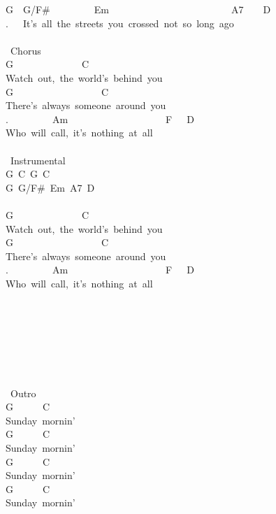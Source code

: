 {G\ \ G/F\#\ \ \ \ \ \ \ \ \ Em\ \ \ \ \ \ \ \ \ \ \ \ \ \ \ \ \ \ \ \ \ \ \ \ \ A7\ \ \ \ D\\
.\ \ \ It's\ all\ the\ streets\ you\ crossed\ not\ so\ long\ ago\\
\\
\lbrack\ Chorus\rbrack\\
G\ \ \ \ \ \ \ \ \ \ \ \ \ \ C\\
Watch\ out,\ the\ world's\ behind\ you\\
G\ \ \ \ \ \ \ \ \ \ \ \ \ \ \ \ \ \ C\\
There's\ always\ someone\ around\ you\\
.\ \ \ \ \ \ \ \ \ Am\ \ \ \ \ \ \ \ \ \ \ \ \ \ \ \ \ \ \ \ F\ \ \ D\\
Who\ will\ call,\ it's\ nothing\ at\ all\\
\\
\lbrack\ Instrumental\rbrack\\
G\ C\ G\ C\ \\
G\ G/F\#\ Em\ A7\ D\\
\\
G\ \ \ \ \ \ \ \ \ \ \ \ \ \ C\\
Watch\ out,\ the\ world's\ behind\ you\\
G\ \ \ \ \ \ \ \ \ \ \ \ \ \ \ \ \ \ C\\
There's\ always\ someone\ around\ you\\
.\ \ \ \ \ \ \ \ \ Am\ \ \ \ \ \ \ \ \ \ \ \ \ \ \ \ \ \ \ \ F\ \ \ D\\
Who\ will\ call,\ it's\ nothing\ at\ all\\
\\
\\
\\
\\
\\
\\
\\
\lbrack\ Outro\rbrack\\
G\ \ \ \ \ \ C\\
Sunday\ mornin'\\
G\ \ \ \ \ \ C\\
Sunday\ mornin'\\
G\ \ \ \ \ \ C\\
Sunday\ mornin'\\
G\ \ \ \ \ \ C\\
Sunday\ mornin'}

